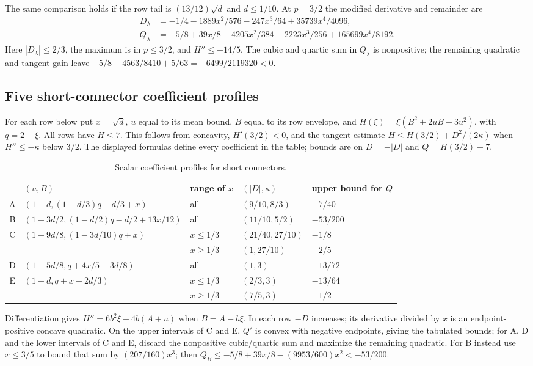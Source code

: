 The same comparison holds if the row tail is $(13/12)\sqrt d$ and
$d\le1/10$. At $p=3/2$ the modified derivative and remainder are
\begin{align*}
 D_\lambda&=-1/4-1889x^2/576-247x^3/64+35739x^4/4096,\\
 Q_\lambda&=-5/8+39x/8-4205x^2/384-2223x^3/256+165699x^4/8192.
\end{align*}
Here $|D_\lambda|\le2/3$, the maximum is in $p\le3/2$, and
$H''\le-14/5$. The cubic and quartic sum in $Q_\lambda$ is nonpositive;
the remaining quadratic and tangent gain leave
$-5/8+4563/8410+5/63=-6499/2119320<0$.

\subsection{Five short-connector coefficient profiles}\label{calc:coefficientprofiles}
For each row below put $x=\sqrt d$, $u$ equal to its mean bound,
$B$ equal to its row envelope, and $H(\xi)=\xi(B^2+2uB+3u^2)$, with $q=2-\xi$.
All rows have $H\le7$. This follows from concavity, $H'(3/2)<0$,
and the tangent estimate $H\le H(3/2)+D^2/(2\kappa)$ when
$H''\le-\kappa$ below $3/2$.
The displayed formulas define every coefficient in the table; bounds
are on $D=-|D|$ and $Q=H(3/2)-7$.
\begin{table}[htbp]
\centering
\caption{Scalar coefficient profiles for short connectors.}\label{tab:profiles}
\small
\begin{tabular}{@{}cllll@{}}
\toprule
 & $(u,B)$ & range of $x$ & $(|D|,\kappa)$ & upper bound for $Q$\\\midrule
A & $(1-d,(1-d/3)q-d/3+x)$ & all & $(9/10,8/3)$ & $-7/40$\\
B & $(1-3d/2,(1-d/2)q-d/2+13x/12)$ & all & $(11/10,5/2)$ & $-53/200$\\
C & $(1-9d/8,(1-3d/10)q+x)$ & $x\le1/3$ & $(21/40,27/10)$ & $-1/8$\\
 & & $x\ge1/3$ & $(1,27/10)$ & $-2/5$\\
D & $(1-5d/8,q+4x/5-3d/8)$ & all & $(1,3)$ & $-13/72$\\
E & $(1-d,q+x-2d/3)$ & $x\le1/3$ & $(2/3,3)$ & $-13/64$\\
 & & $x\ge1/3$ & $(7/5,3)$ & $-1/2$\\\bottomrule
\end{tabular}

\end{table}
Differentiation gives
$H''=6b^2\xi-4b(A+u)$ when $B=A-b\xi$.
In each row $-D$ increases; its derivative divided by $x$ is an
endpoint-positive concave quadratic. On the upper intervals of C and E,
$Q'$ is convex with negative endpoints, giving the tabulated bounds;
for A, D and the lower intervals of C and E, discard the nonpositive
cubic/quartic sum and maximize the remaining quadratic.
For B instead use $x\le3/5$ to bound that sum by $(207/160)x^3$;
then $Q_B\le-5/8+39x/8-(9953/600)x^2<-53/200$.




